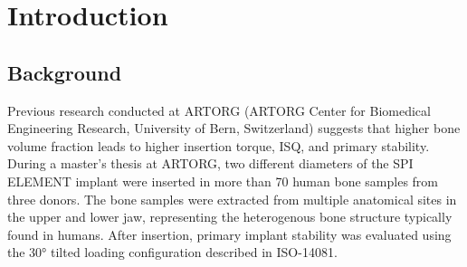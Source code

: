 \documentclass[12pt, a4paper, twoside]{report}
\begin{document}
\tableofcontents
\mainmatter
\clearpage       
%
%
%
%
%
%
%
\chapter{Introduction}
%
%
%
\section{Background}
%
Previous research conducted at ARTORG \cite{voumard_peroperative_2019, ovesy_nonlinear_2018} (ARTORG Center for Biomedical Engineering Research, University of Bern, Switzerland) suggests that higher bone volume fraction leads to higher insertion torque, ISQ, and primary stability.
During a master’s thesis \cite{thierrin_primary_2022} at ARTORG, two different diameters of the SPI ELEMENT implant were inserted in more than 70 human bone samples from three donors.
The bone samples were extracted from multiple anatomical sites in the upper and lower jaw, representing the heterogenous bone structure typically found in humans.
After insertion, primary implant stability was evaluated using the 30° tilted loading configuration described in ISO-14081.
\end{document}
